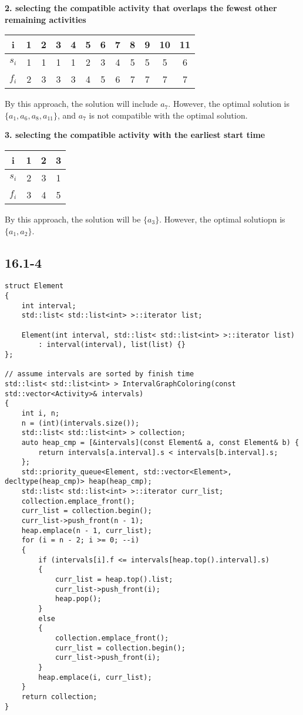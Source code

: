 \textbf{2. selecting the compatible activity that 
    overlaps the fewest other remaining activities}

\begin{tabular}{c|ccccccccccc}
    i & 1 & 2 & 3 & 4 & 5 & 6 & 7 & 8 & 9 & 10 & 11 \\
    \hline
    $s_i$ & 1 & 1 & 1 & 1 & 2 & 3 & 4 & 5 & 5 & 5 & 6 \\
    $f_i$ & 2 & 3 & 3 & 3 & 4 & 5 & 6 & 7 & 7 & 7 & 7 \\
\end{tabular}

By this approach, the solution will include $a_7$.
However, the optimal solution is $\{ a_1, a_6, a_8, a_{11} \}$,
and $a_7$ is not compatible with the optimal solution.

\textbf{3. selecting the compatible activity with the earliest start time}

\begin{tabular}{c|ccc}
    i & 1 & 2 & 3\\
    \hline
    $s_i$ & 2 & 3 & 1 \\
    $f_i$ & 3 & 4 & 5 \\
\end{tabular}

By this approach, the solution will be $\{ a_3 \}$.
However, the optimal solutiopn is $\{ a_1, a_2 \}$.

\subsection*{16.1-4}

\begin{verbatim}
struct Element
{
    int interval;
    std::list< std::list<int> >::iterator list;

    Element(int interval, std::list< std::list<int> >::iterator list)
        : interval(interval), list(list) {}
};

// assume intervals are sorted by finish time
std::list< std::list<int> > IntervalGraphColoring(const std::vector<Activity>& intervals)
{
    int i, n;
    n = (int)(intervals.size());
    std::list< std::list<int> > collection;
    auto heap_cmp = [&intervals](const Element& a, const Element& b) {
        return intervals[a.interval].s < intervals[b.interval].s;
    };
    std::priority_queue<Element, std::vector<Element>, decltype(heap_cmp)> heap(heap_cmp);
    std::list< std::list<int> >::iterator curr_list;
    collection.emplace_front();
    curr_list = collection.begin();
    curr_list->push_front(n - 1);
    heap.emplace(n - 1, curr_list);
    for (i = n - 2; i >= 0; --i)
    {
        if (intervals[i].f <= intervals[heap.top().interval].s)
        {
            curr_list = heap.top().list;
            curr_list->push_front(i);
            heap.pop();
        }
        else
        {
            collection.emplace_front();
            curr_list = collection.begin();
            curr_list->push_front(i);
        }
        heap.emplace(i, curr_list);
    }
    return collection;
}
\end{verbatim}

